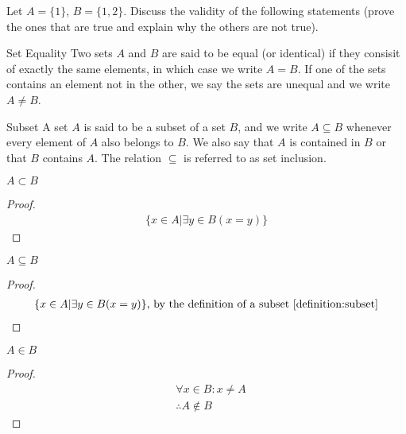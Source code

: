 \begin{question} Let $A = \{1\}$, $B = \{1, 2\}$. Discuss the validity of the following statements (prove the ones that are true and explain why the others are not true).
  \begin{definition}{Set Equality}
    Two sets $A$ and $B$ are said to be equal (or identical) if they consisit of exactly the same elements, in which case we write $A = B$. If one of the sets contains an element not in the other, we say the sets are unequal and we write $A \neq B$.
  \end{definition}
  \begin{definition}{Subset}
    \label{definition:subset}
    A set $A$ is said to be a subset of a set $B$, and we write $A \subseteq B$ whenever every element of $A$ also belongs to $B$. We also say that $A$ is contained in $B$ or that $B$ contains $A$. The relation $\subseteq$ is referred to as set inclusion.
  \end{definition}

  \begin{subquestion}
    $A \subset B$
  \end{subquestion}
  \begin{proof}
    \begin{equation}
      \begin{split}
        \{ x \in A | \exists y \in B (x = y)\}
      \end{split}
    \end{equation}
  \end{proof}

  \begin{subquestion}
    $A \subseteq B$
  \end{subquestion}
  \begin{proof}
    \begin{equation}
      \begin{split}
        \{ x \in A | \exists y \in B (x = y)\} \text{, by the definition of a subset \ref{definition:subset}}
      \end{split}
    \end{equation}
  \end{proof}

  \begin{subquestion}
    $A \in B$
  \end{subquestion}
  \begin{proof}
    \begin{equation}
      \begin{split}
        & \forall x \in B: x \neq A \\
        & \therefore A \notin B
      \end{split}
    \end{equation}
  \end{proof}


\end{question}
